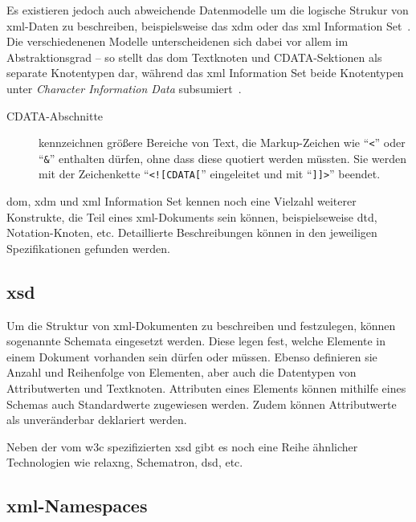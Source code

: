 Es existieren jedoch auch abweichende Datenmodelle um die logische Strukur von \acrshort{xml}-Daten zu beschreiben, beispielsweise das \acrfull{xdm} oder das \acrshort{xml} Information Set~\cite{xmlinfoset}. Die verschiedenenen Modelle unterscheidenen sich dabei vor allem im Abstraktionsgrad -- so stellt das \gls{dom} Textknoten und CDATA-Sektionen als separate Knotentypen dar, während das \acrshort{xml} Information Set beide Knotentypen unter \emph{Character Information Data} subsumiert~\cite[Abschnitt 2.6]{xmlinfoset}.

\begin{description}
    \item[CDATA-Abschnitte] kennzeichnen größere Bereiche von Text, die Markup-Zeichen wie \enquote{\texttt{<}} oder \enquote{\texttt{\&}} enthalten dürfen, ohne dass diese quotiert werden müssten. Sie werden mit der Zeichenkette \enquote{\texttt{<![CDATA[}} eingeleitet und mit \enquote{\texttt{]]>}} beendet.~\cite[Abschnitt 2.7]{maler2008xml}
\end{description}

\gls{dom}, \acrshort{xdm} und \acrshort{xml} Information Set kennen noch eine Vielzahl weiterer Konstrukte, die Teil eines \acrshort{xml}-Dokuments sein können, beispielseweise \acrfull{dtd}, Notation-Knoten, etc. Detaillierte Beschreibungen können in den jeweiligen Spezifikationen gefunden werden.~\cite{dom,xmlinfoset,xdm,maler2008xml}


\subsection{\acrfull{xsd}}
\label{sec:xsd}

Um die Struktur von \acrshort{xml}-Dokumenten zu beschreiben und festzulegen, können sogenannte Schemata eingesetzt werden. Diese legen fest, welche Elemente in einem Dokument vorhanden sein dürfen oder müssen. Ebenso definieren sie Anzahl und Reihenfolge von Elementen, aber auch die Datentypen von Attributwerten und Textknoten. Attributen eines Elements können mithilfe eines Schemas auch Standardwerte zugewiesen werden. Zudem können Attributwerte als unveränderbar deklariert werden.

Neben der vom \gls{w3c} spezifizierten \acrfull{xsd} gibt es noch eine Reihe ähnlicher Technologien wie \acrshort{relaxng}, Schematron, \gls{dsd}, etc.

\subsection{\acrshort{xml}-Namespaces}
\label{sec:xmlns}

